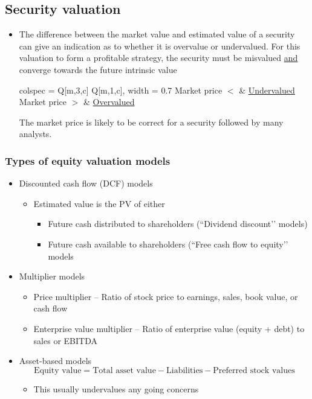 \documentclass[../notes_compiled.tex]{subfiles}
\begin{document}
\subsection{Security valuation}
\begin{itemize}
\item The difference between the market value and estimated value of a security can give an indication as to whether it is overvalue or undervalued. For this valuation to form a profitable strategy, the security must be misvalued \underline{and} converge towards the future intrinsic value
\begin{table}[h!]
\centering
\begin{tblr}{colspec = {Q[m,3,c] Q[m,1,c]}, width = 0.7\textwidth}
Market price $<$  & \underline{Undervalued} \\
Market price $>$  & \underline{Overvalued}
\end{tblr}
\end{table}

The market price is likely to be correct for a security followed by many analysts.
\end{itemize}

\subsubsection{Types of equity valuation models}
\begin{itemize}
\item Discounted cash flow (DCF) models
\begin{itemize}
\item Estimated value is the PV of either
\begin{itemize}
\item Future cash distributed to shareholders (``Dividend discount’’ models)
\item Future cash available to shareholders (``Free cash flow to equity’’ models
\end{itemize}
\end{itemize}
\item Multiplier models
\begin{itemize}
\item Price multiplier -- Ratio of stock price to earnings, sales, book value, or cash flow
\item Enterprise value multiplier -- Ratio of enterprise value (equity + debt) to sales or EBITDA
\end{itemize}
\item Asset-based models
\begin{equation}
\text{Equity value} = \text{Total asset value} - \text{Liabilities} - \text{Preferred stock values}
\end{equation}
\begin{itemize}
\item[] This usually undervalues any going concerns
\end{itemize}
\end{itemize}
\end{document}
